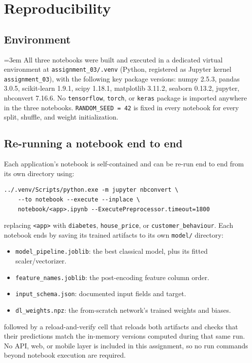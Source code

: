 \documentclass[11pt]{article}
\newcommand{\code}[1]{\texttt{#1}}
\begin{document}
\section{Reproducibility}

\subsection{Environment}

\begingroup\sloppy\emergencystretch=3em
All three notebooks were built and executed in a dedicated virtual environment at
\texttt{assignment\_03/.venv} (Python, registered as Jupyter kernel
\texttt{assignment\_03}), with the following key package versions: numpy 2.5.3, pandas
3.0.5, scikit-learn 1.9.1, scipy 1.18.1, matplotlib 3.11.2, seaborn 0.13.2, jupyter,
nbconvert 7.16.6. No \code{tensorflow}, \code{torch}, or \code{keras} package is
imported anywhere in the three notebooks. \texttt{RANDOM\_SEED = 42} is fixed in every
notebook for every split, shuffle, and weight initialization.
\par\endgroup

\subsection{Re-running a notebook end to end}

Each application's notebook is self-contained and can be re-run end to end from its own
directory using:
\begin{footnotesize}
\begin{verbatim}
../.venv/Scripts/python.exe -m jupyter nbconvert \
    --to notebook --execute --inplace \
    notebook/<app>.ipynb --ExecutePreprocessor.timeout=1800
\end{verbatim}
\end{footnotesize}
replacing \texttt{<app>} with \texttt{diabetes}, \texttt{house\_price}, or
\texttt{customer\_behaviour}. Each notebook ends by saving its trained artifacts to its
own \texttt{model/} directory:
\begin{itemize}[nosep]
  \item \texttt{model\_pipeline.joblib}: the best classical model, plus its fitted
    scaler/vectorizer.
  \item \texttt{feature\_names.joblib}: the post-encoding feature column order.
  \item \texttt{input\_schema.json}: documented input fields and target.
  \item \texttt{dl\_weights.npz}: the from-scratch network's trained weights and biases.
\end{itemize}
followed by a reload-and-verify cell that reloads both artifacts and checks that their
predictions match the in-memory versions computed during that same run. No API, web, or
mobile layer is included in this assignment, so no run commands beyond notebook execution
are required.
\end{document}
